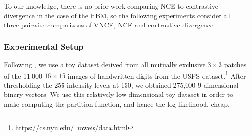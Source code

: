 \documentclass[11pt, oneside]{article}
\theoremstyle{definition}
\begin{document}
To our knowledge, there is no prior work comparing NCE to contrastive divergence in the case of the RBM, so the following experiments consider all three pairwise comparisons of VNCE, NCE and contrastive divergence.



\subsubsection{Experimental Setup}

Following \citet{carreira2005contrastive}, we use a toy dataset derived from all mutually exclusive $3 \times 3$ patches of the 11,000 $16 \times 16$ images of handwritten digits from the USPS dataset.\footnote{https://cs.nyu.edu/~roweis/data.html} After thresholding the 256 intensity levels at 150, we obtained 275,000 9-dimensional binary vectors. We use this relatively low-dimensional toy dataset in order to make computing the partition function, and hence the log-likelihood, cheap.
\end{document}
